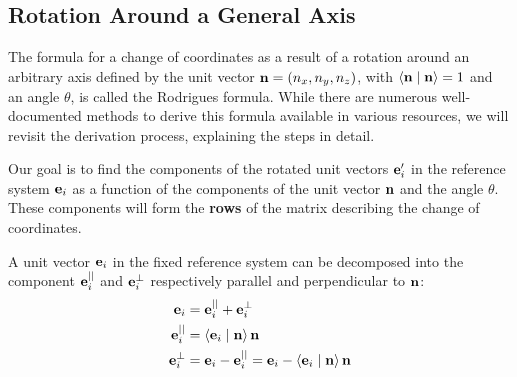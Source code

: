 \documentclass[12pt]{article}
\newcommand{\ip}[2]{\langle #1 \mid #2 \rangle}
\begin{document}
\subsection{Rotation Around a General Axis}

The formula for a change of coordinates as a result of a rotation around an arbitrary axis
defined by the unit vector $\vb{n} = (n_x, n_y, n_z)$, with $\ip{\vb{n}}{\vb{n}} = 1$
and an angle $\theta$, is called the Rodrigues formula. While there are numerous
well-documented methods to derive this formula available in various resources, we will revisit
the derivation process, explaining the steps in detail.

Our goal is to find the components of the rotated unit vectors $\vb{e}'_i$ in the reference
system $\vb{e}_i$ as a function of the components of the unit vector $\vb{n}$ and the angle
$\theta$. These components will form the \textbf{rows} of the matrix describing the change of
coordinates.

A unit vector $\vb{e}_i$ in the fixed reference system can be decomposed into the component
$\vb{e}_i^{||}$ and $\vb{e}_i^{\perp}$ respectively parallel and perpendicular to $\vb{n}$:
\begin{align}
  \vb{e}_i &= \vb{e}_i^{||} + \vb{e}_i^{\perp} \\
  \vb{e}_i^{||} &= \ip{\vb{e}_i}{\vb{n}}\,\vb{n} \\
  \vb{e}_i^{\perp} &= \vb{e}_i - \vb{e}_i^{||} = \vb{e}_i - \ip{\vb{e}_i}{\vb{n}}\,\vb{n}
\end{align}
\end{document}
